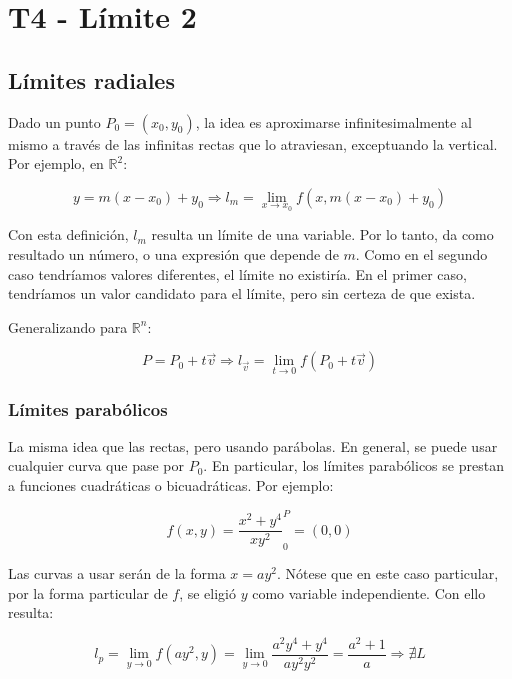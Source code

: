 \documentclass{article}
\renewcommand{\Bbb}{\mathbb}
\begin{document}
\section{T4 - Límite 2}

\subsection{Límites radiales}

Dado un punto $P_0 = (x_0, y_0)$, la idea es aproximarse infinitesimalmente al mismo a través de las infinitas rectas que lo atraviesan, exceptuando la vertical. Por ejemplo, en $\Bbb R^2$:

\begin{equation}
y = m (x-x_0) + y_0 \Rightarrow l_m = \lim_{x \rightarrow x_0} f(x, m (x-x_0) + y_0)
\end{equation}

Con esta definición, $l_m$ resulta un límite de una variable. Por lo tanto, da como resultado un número, o una expresión que depende de $m$. Como en el segundo caso tendríamos valores diferentes, el límite no existiría. En el primer caso, tendríamos un valor candidato para el límite, pero sin certeza de que exista.

Generalizando para $\Bbb R^n$:

\begin{equation}
P = P_0 + t \overrightarrow{v} \Rightarrow l_{\overrightarrow{v}} = \lim_{t \rightarrow 0} f(P_0 + t \overrightarrow{v})
\end{equation}

\subsubsection{Límites parabólicos}

La misma idea que las rectas, pero usando parábolas. En general, se puede usar cualquier curva que pase por $P_0$. En particular, los límites parabólicos se prestan a funciones cuadráticas o bicuadráticas. Por ejemplo:

\begin{equation}
f(x,y) = \frac{x^2 + y^4}{xy^2} ^ P_0 = (0,0)
\end{equation}

Las curvas a usar serán de la forma $x = a y^2$. Nótese que en este caso particular, por la forma particular de $f$, se eligió $y$ como variable independiente. Con ello resulta:

\begin{equation}
l_p = \lim_{y \rightarrow 0} f(ay^2, y) = \lim_{y \rightarrow 0} \frac{a^2 y^4 + y^4}{ay^2y^2} = \frac{a^2 + 1}{a} \Rightarrow \nexists L
\end{equation}
\end{document}
